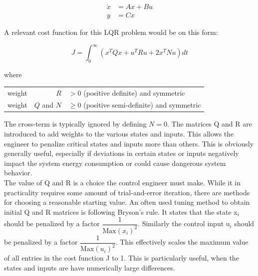 \begin{equation} \label{eq:lqr_discrete_sys}
	\begin{split}
		\dot{x} 	& = Ax + Bu \\
		y 	& = Cx
	\end{split}
\end{equation}

A relevant cost function for this LQR problem would be on this form:

\begin{equation} \label{eq:lqr_cost_fcn}
	J = \int_0^{\infty} \left(x^TQx + u^TRu + 2x^TNu\right)dt
\end{equation}

where

\begin{center}
	\begin{tabular}{l r l }
		weight & $R$         & $ > 0$ (positive definite) and symmetric       \\
		weight & $Q$ and $N$ & $\ge 0$ (positive semi-definite) and symmetric
	\end{tabular}
\end{center}

The cross-term is typically ignored by defining $N=0$. The matrices Q and R are introduced to add weights to the various states and inputs. This allows the engineer to penalize critical states and inputs more than others. This is obviously generally useful, especially if deviations in certain states or inputs negatively impact the system energy consumption or could cause dangerous system behavior.\\

The value of Q and R is a choice the control engineer must make. While it in practicality requires some amount of trial-and-error iteration, there are methods for choosing a reasonable starting value. An often used tuning method to obtain initial Q and R matrices is following Bryson's rule. It states that the state x$_{\textit{i}}$ should be penalized by a factor $\dfrac{1}{\text{Max} \left(x_{\textit{i}}\right)^2}$. Similarly the control input u$_{\textit{i}}$ should be penalized by a factor $\dfrac{1}{\text{Max} \left(u_{\textit{i}}\right)^2}$. This effectively scales the maximum value of all entries in the cost function J to 1. This is particularly useful, when the states and inputs are have numerically large differences.\\



